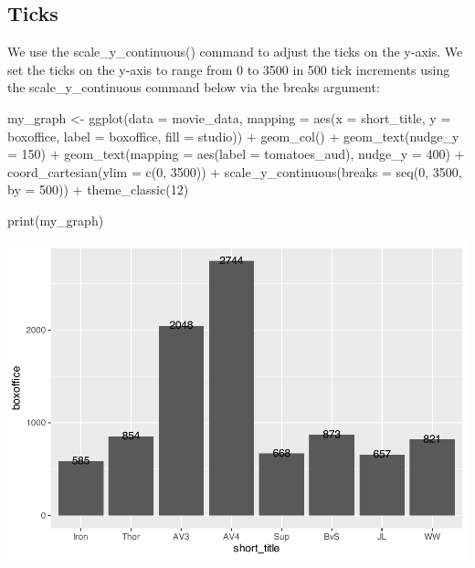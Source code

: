 \documentclass[
]{krantz}
\makeatletter
\newenvironment{Shaded}{\begin{snugshade}}{\end{snugshade}}
\newcommand{\AttributeTok}[1]{\textcolor[rgb]{0.61,0.61,0.61}{#1}}
\newcommand{\DecValTok}[1]{\textcolor[rgb]{0.06,0.06,0.06}{#1}}
\newcommand{\FunctionTok}[1]{\textcolor[rgb]{0,0,0}{#1}}
\newcommand{\NormalTok}[1]{#1}
\newcommand{\OtherTok}[1]{\textcolor[rgb]{0.37,0.37,0.37}{#1}}
\newcommand{\SpecialCharTok}[1]{\textcolor[rgb]{0,0,0}{#1}}
\newenvironment{kframe}{%
\medskip{}
\setlength{\fboxsep}{.8em}
 \def\at@end@of@kframe{}%
 \ifinner\ifhmode%
  \def\at@end@of@kframe{\end{minipage}}%
  \begin{minipage}{\columnwidth}%
 \fi\fi%
 \def\FrameCommand##1{\hskip\@totalleftmargin \hskip-\fboxsep
 \colorbox{shadecolor}{##1}\hskip-\fboxsep
     \hskip-\linewidth \hskip-\@totalleftmargin \hskip\columnwidth}%
 \MakeFramed {\advance\hsize-\width
   \@totalleftmargin\z@ \linewidth\hsize
   \@setminipage}}%
 {\par\unskip\endMakeFramed%
 \at@end@of@kframe}
\renewenvironment{Shaded}{\begin{kframe}}{\end{kframe}}
\makeatother
\begin{document}
\hypertarget{ticks}{%
\subsection{Ticks}\label{ticks}}

We use the scale\_y\_continuous() command to adjust the ticks on the y-axis. We set the ticks on the y-axis to range from 0 to 3500 in 500 tick increments using the scale\_y\_continuous command below via the breaks argument:

\begin{Shaded}
\begin{Highlighting}[]
\NormalTok{my\_graph }\OtherTok{\textless{}{-}} \FunctionTok{ggplot}\NormalTok{(}\AttributeTok{data =}\NormalTok{ movie\_data,}
           \AttributeTok{mapping =} \FunctionTok{aes}\NormalTok{(}\AttributeTok{x =}\NormalTok{ short\_title,}
                         \AttributeTok{y =}\NormalTok{ boxoffice,}
                         \AttributeTok{label =}\NormalTok{ boxoffice, }
                         \AttributeTok{fill =}\NormalTok{ studio)) }\SpecialCharTok{+}
  \FunctionTok{geom\_col}\NormalTok{() }\SpecialCharTok{+}
  \FunctionTok{geom\_text}\NormalTok{(}\AttributeTok{nudge\_y =} \DecValTok{150}\NormalTok{)  }\SpecialCharTok{+}
  \FunctionTok{geom\_text}\NormalTok{(}\AttributeTok{mapping =} \FunctionTok{aes}\NormalTok{(}\AttributeTok{label =}\NormalTok{ tomatoes\_aud), }
            \AttributeTok{nudge\_y =} \DecValTok{400}\NormalTok{) }\SpecialCharTok{+}
  \FunctionTok{coord\_cartesian}\NormalTok{(}\AttributeTok{ylim =} \FunctionTok{c}\NormalTok{(}\DecValTok{0}\NormalTok{, }\DecValTok{3500}\NormalTok{)) }\SpecialCharTok{+}
  \FunctionTok{scale\_y\_continuous}\NormalTok{(}\AttributeTok{breaks =} \FunctionTok{seq}\NormalTok{(}\DecValTok{0}\NormalTok{, }\DecValTok{3500}\NormalTok{, }\AttributeTok{by =} \DecValTok{500}\NormalTok{)) }\SpecialCharTok{+}
  \FunctionTok{theme\_classic}\NormalTok{(}\DecValTok{12}\NormalTok{)}

\FunctionTok{print}\NormalTok{(my\_graph)}
\end{Highlighting}
\end{Shaded}

\includegraphics[width=0.65\linewidth]{bookdown_files/figure-latex/unnamed-chunk-111-1}
\end{document}
